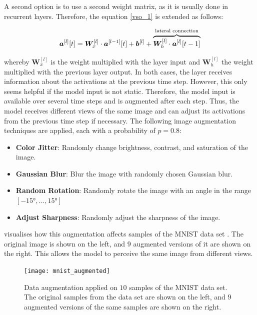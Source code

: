 A second option is to use a second weight matrix, as it is usually done in recurrent layers. Therefore, the equation \eqref{vso_1} is extended as follows:

\begin{equation}\eqlbl{vso_13}
		\boldsymbol{a}^{[l]}[t] =  \boldsymbol{W}_x^{[l]} \cdot \boldsymbol{a}^{[l-1]}[t] + \boldsymbol{b}^{[l]} + \overbrace{\boldsymbol{W}_h^{[l]} \cdot \boldsymbol{a}^{[l]}[t-1] }^{\text{lateral connection}}
\end{equation}

whereby $\boldsymbol{W}_x^{[l]}$ is the weight multiplied with the layer input and $\boldsymbol{W}_h^{[l]}$ the weight multiplied with the previous layer output. In both cases, the layer receives information about the activations at the previous time step.
However, this only seems helpful if the model input is not static. Therefore, the model input is available over several time steps and is augmented after each step. Thus, the model receives different views of the same image and can adjust its activations from the previous time step if necessary. The following image augmentation techniques are applied, each with a probability of $p=0.8$:

\begin{itemize}
	\item \textbf{Color Jitter}: Randomly change brightness, contrast, and saturation of the image.
	\item \textbf{Gaussian Blur}: Blur the image with randomly chosen Gaussian blur.
	\item \textbf{Random Rotation}: Randomly rotate the image with an angle in the range $[-15°, ..., 15°]$
	\item \textbf{Adjust Sharpness}: Randomly adjust the sharpness of the image.
\end{itemize}

 visualises how this augmentation affects samples of the MNIST data set \cite{Lecun_Bottou_Bengio_Haffner_1998}. The original image is shown on the left, and $9$ augmented versions of it are shown on the right. This allows the model to perceive the same image from different views.

\begin{figure}[h]
    \centering
    \texttt{[image: mnist\_augmented]}
    \caption[Data augmentation applied on $10$ samples of the MNIST data set]{Data augmentation applied on $10$ samples of the MNIST data set. The original samples from the data set are shown on the left, and $9$ augmented versions of the same samples are shown on the right.}
\end{figure}


